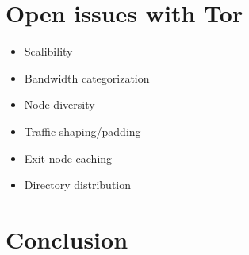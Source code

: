 \documentclass{llncs}
\begin{document}
\section{Open issues with Tor} \label{openissues}
\begin{itemize}
	\item{Scalibility}
	\item{Bandwidth categorization}
	\item{Node diversity}
	\item{Traffic shaping/padding}
	\item{Exit node caching}
	\item{Directory distribution}
\end{itemize}

\section{Conclusion} \label{conclusion}



\end{document}
